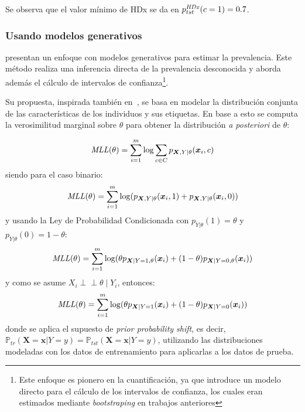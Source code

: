 Se observa que el valor mínimo de HDx se da en \(p^{\it HDx \/}_{tst}(c=1) =
0.7\).

\subsubsection{Usando modelos generativos}\label{estimacion:generativos}

\citet{keith2018uncertainty} presentan un enfoque con modelos generativos para
estimar la prevalencia. Este método realiza una inferencia directa de la
prevalencia desconocida y aborda además el cálculo de intervalos de
confianza\footnote{Este enfoque es pionero en la cuantificación, ya que
introduce un modelo directo para el cálculo de los intervalos de confianza, los
cuales eran estimados mediante {\it bootstraping\/} en trabajos anteriores}.

Su propuesta, inspirada también en~\citet{saerens2002adjusting}, se basa en
modelar la distribución conjunta de las características de los individuos y sus
etiquetas. En base a esto se computa la verosimilitud marginal sobre \(\theta\)
para obtener la distribución {\it a posteriori\/} de \(\theta\):

\begin{equation}\label{ecuacion:mll_1}
    {\it MLL\/}(\theta) = \sum \limits_{i=1}^{m} {\log \sum_{c \in C}{p_{\boldsymbol{X}, Y | \theta}(\boldsymbol{x}_i, c)}}
\end{equation}
siendo para el caso binario:
\begin{equation}\label{ecuacion:mll_2}
    {\it MLL\/}(\theta) = \sum \limits_{i=1}^{m} {\log (p_{\boldsymbol{X}, Y | \theta}(\boldsymbol{x}_i, 1) + p_{\boldsymbol{X}, Y | \theta}(\boldsymbol{x}_i, 0))}
\end{equation}
y usando la Ley de Probabilidad Condicionada con \(p_{Y | \theta}(1)= \theta\) y
\(p_{Y | \theta}(0)= 1 - \theta\):
\begin{equation}\label{ecuacion:mll_3}
    {\it MLL\/}(\theta) = \sum \limits_{i=1}^{m} {\log ({{\theta} p_{\boldsymbol{X} | {Y=1,\theta}}(\boldsymbol{x}_i) + (1- \theta) p_{\boldsymbol{X} | {Y=0,\theta}}(\boldsymbol{x}_i)})}
\end{equation}
y como se asume $X_i \perp \!\!\! \perp \theta \mid Y_i$, entonces:
\begin{equation}\label{ecuacion:mll_fin}
    {\it MLL\/}(\theta) = \sum \limits_{i=1}^{m} {\log ({{\theta} p_{\boldsymbol{X} | {Y=1}}(\boldsymbol{x}_i) + (1- \theta) p_{\boldsymbol{X} | {Y=0}}(\boldsymbol{x}_i)})}
\end{equation}
donde se aplica el supuesto de {\it prior probability shift}, es decir,
$\mathbb{P}_{tr}(\boldsymbol{X}=\boldsymbol{x}|Y=y) =
\mathbb{P}_{tst}(\boldsymbol{X}=\boldsymbol{x}|Y=y)$, utilizando las
distribuciones modeladas con los datos de entrenamiento para aplicarlas a los
datos de prueba.

